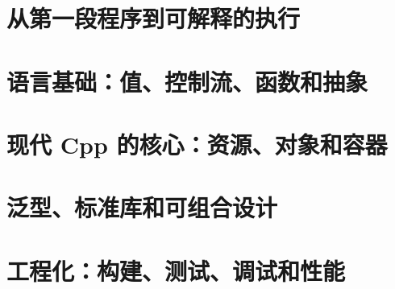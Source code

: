 \documentclass[UTF8,openany,zihao=5,fontset=none]{ctexbook}
\begin{document}
\frontmatter




\tableofcontents

\mainmatter

\part{从第一段程序到可解释的执行}




\part{语言基础：值、控制流、函数和抽象}







\part{现代 Cpp 的核心：资源、对象和容器}







\part{泛型、标准库和可组合设计}






\part{工程化：构建、测试、调试和性能}





\end{document}
